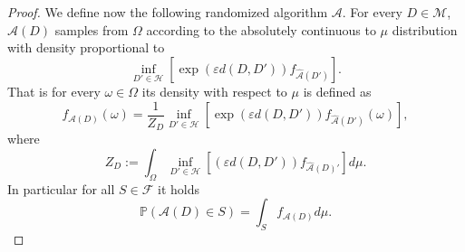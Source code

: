 \documentclass[12pt,a4paper]{article}
\numberwithin{equation}{section}
\numberwithin{equation}{section}
\renewcommand{\epsilon}{\varepsilon}
\newcommand{\1}{{\text{\Large $\mathfrak 1$}}}
\newcommand{\2}[1]{{\text{\Large $\mathfrak 1$}\!\left(#1\right)}}
\begin{document}
\begin{proof}
 We define now the following randomized algorithm $\mathcal{A}$. For every $D \in \mathcal{M}$, $\mathcal{A}(D)$ samples from $\Omega$ according to the absolutely continuous to $\mu$ distribution with density proportional to $$\inf_{D' \in \mathcal{H}} \left[ \exp\left(\epsilon d(D,D')\right) f_{\hat{\mathcal{A}}(D')} \right].$$ That is for every $\omega \in \Omega$ its density with respect to $\mu$  is defined as \begin{equation*}f_{\mathcal{A}(D)}(\omega) =\frac{1}{Z_D} \inf_{D' \in \mathcal{H}} \left[ \exp\left(\epsilon d(D,D')\right) f_{\hat{\mathcal{A}}(D')}(\omega) \right],\end{equation*} where \begin{equation*}Z_D:=\int_{\Omega} \inf_{D' \in \mathcal{H}} \left[ \left(\epsilon d(D,D')\right) f_{\hat{\mathcal{A}}(D)'} \right] d \mu.\end{equation*}In particular for all $S \in \mathcal{F}$ it holds $$\mathbb{P}(\mathcal{A}(D) \in S)=\int_S f_{\mathcal{A}(D)}d \mu.$$


\end{proof}
\end{document}
